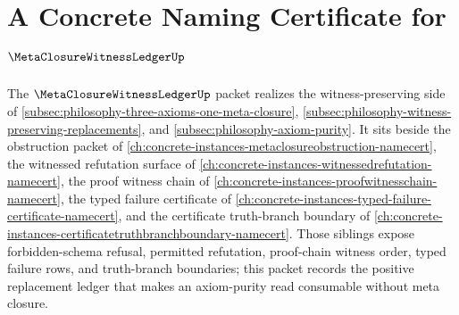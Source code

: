 \chapter{A Concrete Naming Certificate for $\MetaClosureWitnessLedgerUp$}
\label{ch:concrete-instances-meta-closure-witness-ledger-namecert}

The $\MetaClosureWitnessLedgerUp$ packet realizes the witness-preserving side of \autoref{subsec:philosophy-three-axioms-one-meta-closure}, \autoref{subsec:philosophy-witness-preserving-replacements}, and \autoref{subsec:philosophy-axiom-purity}. It sits beside the obstruction packet of \autoref{ch:concrete-instances-metaclosureobstruction-namecert}, the witnessed refutation surface of \autoref{ch:concrete-instances-witnessedrefutation-namecert}, the proof witness chain of \autoref{ch:concrete-instances-proofwitnesschain-namecert}, the typed failure certificate of \autoref{ch:concrete-instances-typed-failure-certificate-namecert}, and the certificate truth-branch boundary of \autoref{ch:concrete-instances-certificatetruthbranchboundary-namecert}. Those siblings expose forbidden-schema refusal, permitted refutation, proof-chain witness order, typed failure rows, and truth-branch boundaries; this packet records the positive replacement ledger that makes an axiom-purity read consumable without meta closure.

